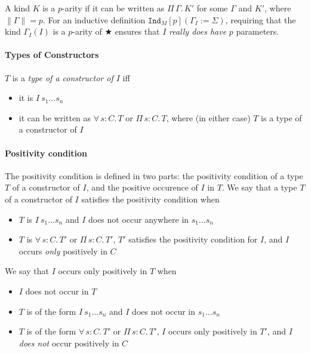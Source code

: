 \documentclass{article}
\newcommand{\abs}[4]{{#1}\, #2\! : \! #3.\, #4}
\newcommand{\absu}[3]{{#1}\, #2.\, #3}
\newcommand{\indast}[4]{\texttt{Ind}_{#1} [#2] (#3 := #4)}
\newcommand{\lenc}[1]{\|#1\|}
\newcommand{\piforall}{^{\Pi}_{\forall}}
\begin{document}
A kind $K$ is a $p$-arity if it can be written as $\absu{\Pi}{\Gamma}{K'}$ for
some $\Gamma$ and $K'$, where $\lenc{\Gamma} = p$. For an inductive definition
$\indast{M}{p}{\Gamma_I}{\Sigma}$, requiring that the kind $\Gamma_{I}(I)$ is a $p$-arity
of ★ ensures that $I$ \textit{really does have} $p$ parameters.

\paragraph{Types of Constructors}
$T$ is a \textit{type of a constructor of $I$} iff
\begin{itemize}
\item it is $I\ s_1 ... s_n$
\item it can be written as $\abs{\forall}{s}{C}{T}$ or $\abs{\Pi}{s}{C}{T}$,
  where (in either case) $T$ is a type of a constructor of $I$
\end{itemize}

\paragraph{Positivity condition}
The positivity condition is defined in two parts: the positivity condition of
a type $T$ of a constructor of $I$, and the positive occurence of $I$ in $T$.
We say that a type $T$ of a constructor of $I$ satisfies the positivity condition
when

\begin{itemize}
\item $T$ is $I\ s_1... s_n$ and $I$ does not occur anywhere in $s_1...s_n$
\item $T$ is $\abs{\forall}{s}{C}{T'}$ or $\abs{\Pi}{s}{C}{T'}$, $T'$ satisfies
  the positivity condition for $I$, and $I$ occurs \textit{only} positively in $C$ 
\end{itemize}

\noindent We say that $I$ occurs only positively in $T$ when
\begin{itemize}
\item $I$ does not occur in $T$
\item $T$ is of the form $I\ s_1 ... s_n$ and $I$ does not occur in $s_1 ...
  s_n$
\item $T$ is of the form $\abs{\forall}{s}{C}{T'}$ or $\abs{\Pi}{s}{C}{T'}$, $I$
  occurs only positively in $T'$, and $I$ \textit{does not} occur positively in $C$
\end{itemize}
\end{document}
